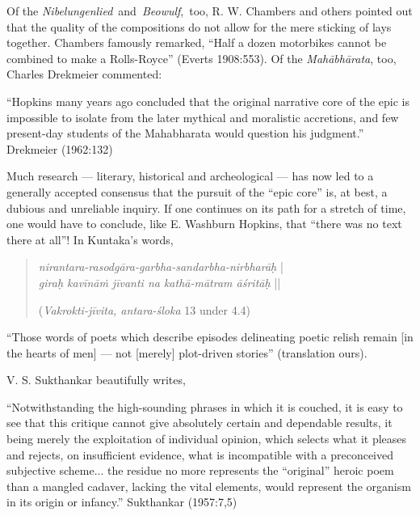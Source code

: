 Of the {\sl Nibelungenlied} and {\sl Beowulf}, too, R. W. Chambers and others pointed out that the quality of the compositions do not allow for the mere sticking of lays together. Chambers famously remarked, “Half a dozen motorbikes cannot be combined to make a Rolls-Royce” (Everts 1908:553). Of the {\sl Mahābhārata}, too, Charles Drekmeier commented:

\begin{myquote}
“Hopkins many years ago concluded that the original narrative core of the epic is impossible to isolate from the later mythical and moralistic accretions, and few present-day students of the Mahabharata would question his judgment.”
\hfill Drekmeier (1962:132)
\end{myquote}

Much research --- literary, historical and archeological --- has now led to a generally accepted consensus that the pursuit of the “epic core” is, at best, a dubious and unreliable inquiry. If one continues on its path for a stretch of time, one would have to conclude, like E. Washburn Hopkins, that “there was no text there at all”! In Kuntaka's words, 
\begin{quote}
{{\sl nirantara-rasodgāra-garbha-sandarbha-nirbharāḥ}} |\\
{\sl giraḥ kavīnāṁ jīvanti na kathā-mātram āśritāḥ} || 

\hfill({\sl Vakrokti-jīvita, antara-śloka} 13 under 4.4)
\end{quote}

\begin{myquote}
``Those words of poets which describe episodes delineating poetic relish remain [in the hearts of men] --- not [merely] plot-driven stories'' (translation ours).
\end{myquote}

V. S. Sukthankar beautifully writes, 

\begin{myquote}
“Notwithstanding the high-sounding phrases in which it is couched, it is easy to see that this critique cannot give absolutely certain and dependable results, it being merely the exploitation of individual opinion, which selects what it pleases and rejects, on insufficient evidence, what is incompatible with a preconceived subjective scheme... the residue no more represents the “original” heroic poem than a mangled cadaver, lacking the vital elements, would represent the organism in its origin or infancy.”
\hfill Sukthankar (1957:7,5)\\[-.6cm]
\end{myquote}

